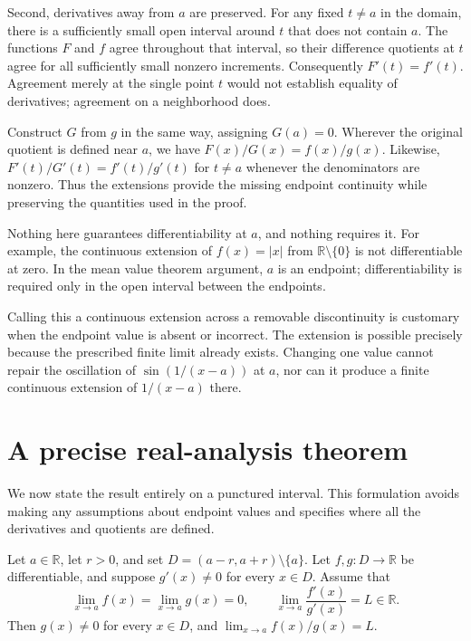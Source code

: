 \documentclass{essay}
\begin{document}
Second, derivatives away from \(a\) are preserved. For any fixed \(t\ne a\)
in the domain, there is a sufficiently small open interval around \(t\)
that does not contain \(a\). The functions \(F\) and \(f\) agree throughout
that interval, so their difference quotients at \(t\) agree for all
sufficiently small nonzero increments. Consequently \(F'(t)=f'(t)\).
Agreement merely at the single point \(t\) would not establish equality
of derivatives; agreement on a neighborhood does.

Construct \(G\) from \(g\) in the same way, assigning \(G(a)=0\). Wherever the
original quotient is defined near \(a\), we have \(F(x)/G(x)=f(x)/g(x)\).
Likewise, \(F'(t)/G'(t)=f'(t)/g'(t)\) for \(t\ne a\) whenever the denominators
are nonzero. Thus the extensions provide the missing endpoint continuity
while preserving the quantities used in the proof.

Nothing here guarantees differentiability at \(a\), and nothing requires
it. For example, the continuous extension of \(f(x)=|x|\) from
\(\mathbb{R}\setminus\{0\}\) is not differentiable at zero. In the mean value
theorem argument, \(a\) is an endpoint; differentiability is required only
in the open interval between the endpoints.

Calling this a continuous extension across a removable discontinuity is
customary when the endpoint value is absent or incorrect. The extension
is possible precisely because the prescribed finite limit already
exists. Changing one value cannot repair the oscillation of
\(\sin(1/(x-a))\) at \(a\), nor can it produce a finite continuous extension
of \(1/(x-a)\) there.

\section{A precise real-analysis theorem}

We now state the result entirely on a punctured interval. This formulation
avoids making any assumptions about endpoint values and specifies where
all the derivatives and quotients are defined.

\begin{theorem}
  Let \(a\in\mathbb{R}\), let \(r>0\), and set
  \(D=(a-r,a+r)\setminus\{a\}\). Let \(f,g:D\to\mathbb{R}\) be differentiable,
  and suppose \(g'(x)\ne0\) for every \(x\in D\). Assume that
  \[ \lim_{x\to a}f(x)=\lim_{x\to a}g(x)=0, \qquad \lim_{x\to a}\frac{f'(x)}{g'(x)}=L\in\mathbb{R}. \]
  Then \(g(x)\ne0\) for every \(x\in D\), and
  \(\lim_{x\to a}f(x)/g(x)=L\).
\end{theorem}
\end{document}
